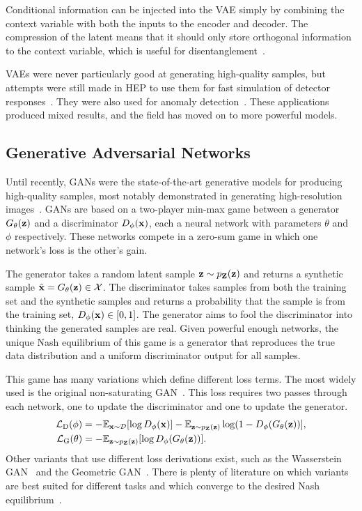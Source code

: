 Conditional information can be injected into the VAE simply by combining the context variable with both the inputs to the encoder and decoder.
The compression of the latent means that it should only store orthogonal information to the context variable, which is useful for disentanglement~\cite{cVAE}.

\Glspl{VAE} were never particularly good at generating high-quality samples, but attempts were still made in HEP to use them for fast simulation of detector responses~\cite{VariationalAutoencodersJet, GraphVariationalAutoencoder, ParticlebasedFastJet}.
They were also used for anomaly detection~\cite{VariationalAutoencodersAnomalous, DeepSetVAE, MassiveIssueAnomaly}.
These applications produced mixed results, and the field has moved on to more powerful models.

\subsection{Generative Adversarial Networks}
\label{sec:gan}

Until recently, \Glspl{GAN} were the state-of-the-art generative models for producing high-quality samples, most notably demonstrated in generating high-resolution images~\cite{StyleGAN2, StyleGAN3}.
\Glspl{GAN} are based on a two-player min-max game between a generator $G_\theta(\mathbf{z})$ and a discriminator $D_\phi(\mathbf{x})$, each a neural network with parameters $\theta$ and $\phi$ respectively.
These networks compete in a zero-sum game in which one network's loss is the other's gain.

The generator takes a random latent sample $\mathbf{z} \sim p_{\mathbf{Z}}(\mathbf{z})$ and returns a synthetic sample $\hat{\mathbf{x}} = G_\theta(\mathbf{z}) \in \mathcal{X}$.
The discriminator takes samples from both the training set and the synthetic samples and returns a probability that the sample is from the training set, $D_\phi(\mathbf{x}) \in [0, 1]$.
The generator aims to fool the discriminator into thinking the generated samples are real.
Given powerful enough networks, the unique Nash equilibrium of this game is a generator that reproduces the true data distribution and a uniform discriminator output for all samples.

This game has many variations which define different loss terms.
The most widely used is the original non-saturating \Gls{GAN}~\cite{GenerativeAdversarialNetworks}.
This loss requires two passes through each network, one to update the discriminator and one to update the generator.
\begin{align}
    \mathcal{L}_{\text{D}}(\phi)   & = -\mathbb{E}_{\mathbf{x} \sim \mathcal{D}}[\log D_{\phi}(\mathbf{x})] - \mathbb{E}_{\mathbf{z} \sim p_{\mathbf{Z}}(\mathbf{z})}\log(1 - D_{\phi}(G_{\theta}(\mathbf{z}))], \\
    \mathcal{L}_{\text{G}}(\theta) & = -\mathbb{E}_{\mathbf{z} \sim p_{\mathbf{Z}}(\mathbf{z})}[\log D_{\phi}(G_{\theta}(\mathbf{z}))].
\end{align}
Other variants that use different loss derivations exist, such as the Wasserstein \Gls{GAN}~\cite{WGAN1} and the Geometric \Gls{GAN}~\cite{GeometricGAN}.
There is plenty of literature on which variants are best suited for different tasks and which converge to the desired Nash equilibrium~\cite{WhichTrainingMethods}.

